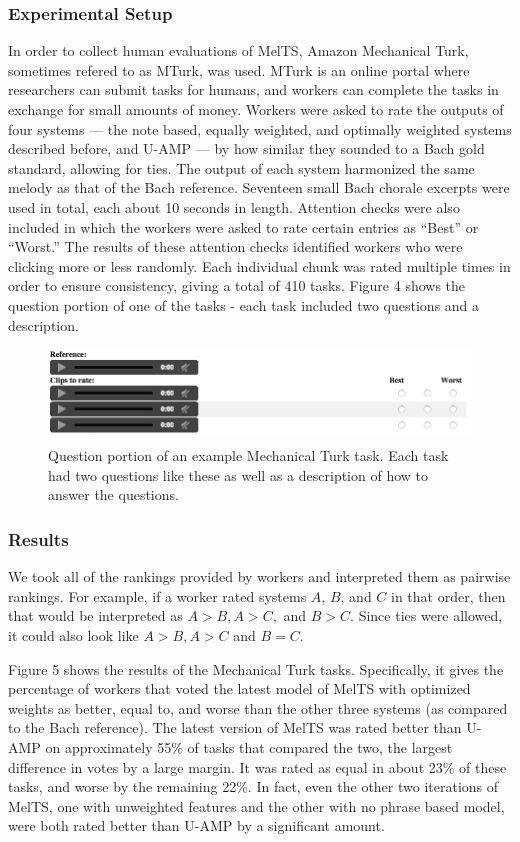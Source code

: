 \documentclass{sig-alternate}
\begin{document}
\subsubsection{Experimental Setup}
In order to collect human evaluations of MelTS, Amazon Mechanical Turk, sometimes refered to as MTurk, was used. MTurk is an online portal where researchers can submit tasks for humans, and workers can complete the tasks in exchange for small amounts of money. Workers were asked to rate the outputs of four systems --- the note based, equally weighted, and optimally weighted systems described before, and U-AMP \cite{UAMP} --- by how similar they sounded to a Bach gold standard, allowing for ties. The output of each system harmonized the same melody as that of the Bach reference. Seventeen small Bach chorale excerpts were used in total, each about 10 seconds in length. Attention checks were also included in which the workers were asked to rate certain entries as ``Best'' or ``Worst.'' The results of these attention checks identified workers who were clicking more or less randomly. Each individual chunk was rated multiple times in order to ensure consistency, giving a total of 410 tasks. Figure 4 shows the question portion of one of the tasks - each task included two questions and a description.

\begin{figure}
\includegraphics[scale=0.3]{mturk_task}
\caption{Question portion of an example Mechanical Turk task. Each task had two questions like these as well as a description of how to answer the questions.}
\end{figure}

\subsubsection{Results}
We took all of the rankings provided by workers and interpreted them as pairwise rankings. For example, if a worker rated systems $A$, $B$, and $C$ in that order, then that would be interpreted as $A>B, A>C,$ and $B>C$. Since ties were allowed, it could also look like $A>B, A>C$ and $B=C$. 

Figure 5 shows the results of the Mechanical Turk tasks. Specifically, it gives the percentage of workers that voted the latest model of MelTS with optimized weights as better, equal to, and worse than the other three systems (as compared to the Bach reference). The latest version of MelTS was rated better than U-AMP on approximately 55\% of tasks that compared the two, the largest difference in votes by a large margin. It was rated as equal in about 23\% of these tasks, and worse by the remaining 22\%. In fact, even the other two iterations of MelTS, one with unweighted features and the other with no phrase based model, were both rated better than U-AMP by a significant amount.
\end{document}
